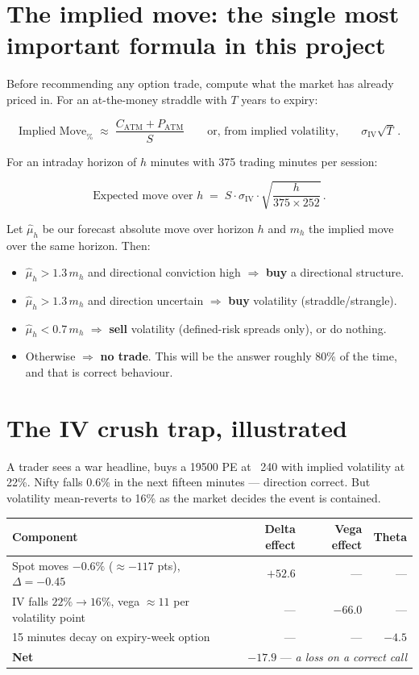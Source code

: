 \section{The implied move: the single most important formula in this project}

Before recommending any option trade, compute what the market has already priced
in. For an at-the-money straddle with $T$ years to expiry:

\[
\text{Implied Move}_{\%} \;\approx\; \frac{C_{\text{ATM}} + P_{\text{ATM}}}{S}
\qquad\text{or, from implied volatility,}\qquad
\sigma_{\text{IV}}\sqrt{T}\,.
\]

For an intraday horizon of $h$ minutes with 375 trading minutes per session:

\[
\text{Expected move over } h \;=\; S \cdot \sigma_{\text{IV}} \cdot
\sqrt{\frac{h}{375 \times 252}}\,.
\]

\begin{keybox}[title={The trade filter}]
Let $\hat{\mu}_h$ be our forecast absolute move over horizon $h$ and $m_h$ the
implied move over the same horizon. Then:
\begin{itemize}
\item $\hat{\mu}_h > 1.3\, m_h$ and directional conviction high $\Rightarrow$
\textbf{buy} a directional structure.
\item $\hat{\mu}_h > 1.3\, m_h$ and direction uncertain $\Rightarrow$
\textbf{buy} volatility (straddle/strangle).
\item $\hat{\mu}_h < 0.7\, m_h$ $\Rightarrow$ \textbf{sell} volatility
(defined-risk spreads only), or do nothing.
\item Otherwise $\Rightarrow$ \textbf{no trade}. This will be the answer roughly
80\% of the time, and that is correct behaviour.
\end{itemize}
\end{keybox}

\section{The IV crush trap, illustrated}

A trader sees a war headline, buys a 19500 PE at \rs~240 with implied volatility
at 22\%. Nifty falls 0.6\% in the next fifteen minutes --- direction correct.
But volatility mean-reverts to 16\% as the market decides the event is contained.

\begin{longtable}{@{}lrrr@{}}
\toprule
\textbf{Component} & \textbf{Delta effect} & \textbf{Vega effect} & \textbf{Theta}\\
\midrule
Spot moves $-0.6\%$ ($\approx -117$ pts), $\Delta = -0.45$ & $+52.6$ & --- & ---\\
IV falls $22\% \to 16\%$, vega $\approx 11$ per volatility point & --- & $-66.0$ & ---\\
15 minutes decay on expiry-week option & --- & --- & $-4.5$\\
\midrule
\textbf{Net} & \multicolumn{3}{r}{$\mathbf{-17.9}$ --- \emph{a loss on a correct call}}\\
\bottomrule
\end{longtable}

